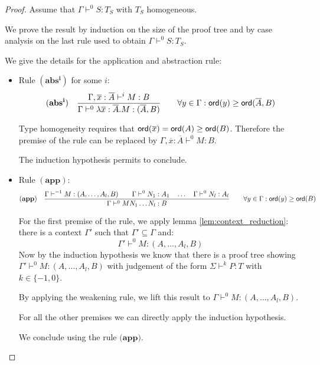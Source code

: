 \begin{proof}
Assume that $\Gamma \vdash^{0} S : T_S$ with $T_S$ homogeneous.

We prove the result by induction on the size of the proof tree and
by case analysis on the last rule used to obtain $\Gamma \vdash^{0}
S : T_S$.

We give the details for the application and abstraction rule:
\begin{itemize}
\item Rule $\mathbf{(abs^i)}$ for some $i$:
$$ \mathbf{(abs^i)} \quad  \frac{\displaystyle \Gamma, \overline{x} : \overline{A} \vdash^i M : B}{\Gamma  \vdash^{0} \lambda \overline{x} : \overline{A} . M : (\overline{A},B)} \qquad
                                   \forall y \in \Gamma : {\sf ord}(y) \geq {\sf ord}(\overline{A},B)$$

Type homogeneity requires that ${\sf ord}(\overline{x}) = {\sf ord}(A) \geq
{\sf ord}(B)$. Therefore the premise of the rule can be replaced by
$\Gamma, \overline{x} : \overline{A} \vdash^0 M : B$.

The induction hypothesis permits to conclude.

\item Rule $\mathbf{(app)}$:
$$ \mathbf{(app)} \quad  \frac{\displaystyle \Gamma \vdash^{-1} M : (A,\ldots,A_l,B)
                                        \qquad \Gamma \vdash^{0} N_1 : A_1
                                        \quad \ldots \quad \Gamma \vdash^{0} N_l : A_l  }{\Gamma  \vdash^0 M N_1 \ldots N_l : B}
                                    \qquad
                                   \forall y \in \Gamma : {\sf ord}(y) \geq {\sf ord}(B)$$

For the first premise of the rule, we apply lemma
\ref{lem:context_reduction}: there is a context $\Gamma'$ such that
$\Gamma' \subseteq \Gamma$ and:
$$ \Gamma' \vdash^{0} M : (A,\ldots,A_l,B) $$
Now by the induction hypothesis we know that there is a proof tree
showing $\Gamma' \vdash^{0} M : (A,\ldots,A_l,B)$ with judgement of
the form $\Sigma \vdash^{k} P : T$ with $k\in \{-1,0\}$.

By applying the weakening rule, we lift this result to $\Gamma
\vdash^{0} M : (A,\ldots,A_l,B)$.

For all the other premises we can directly apply the induction
hypothesis.

We conclude using the rule $\textbf{(app)}$.
\end{itemize}
\end{proof}

